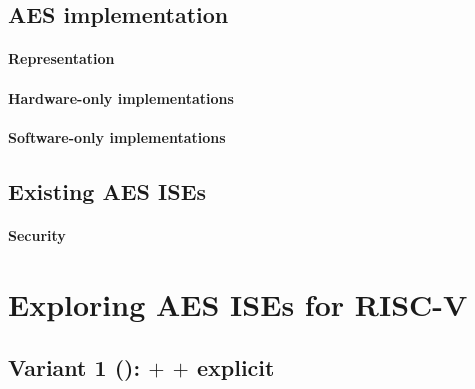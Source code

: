 \documentclass[preprint]{iacrtrans}
\begin{document}
\subsection{AES implementation}
\label{sec:bg:aes_impl}

\paragraph{Representation}
\label{sec:bg:aes_impl_rep}


\paragraph{Hardware-only implementations}
\label{sec:bg:aes_impl_hw}

\paragraph{Software-only implementations}
\label{sec:bg:aes_impl_sw}

\subsection{Existing AES ISEs}
\label{sec:bg:aes_impl_ise}


\paragraph{Security}
\label{sec:bg:aes_impl_sec}



\section{Exploring AES ISEs for RISC-V}
\label{sec:ise}


\label{sec:ise:design}



\subsection{Variant 1 ():  $+$  $+$ explicit }
\label{sec:ise:design:v1}

\end{document}
